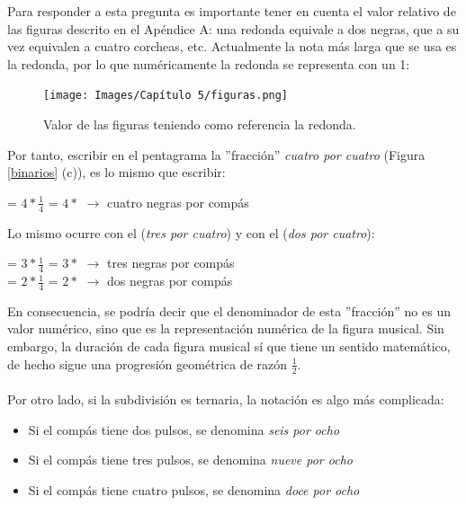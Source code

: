 \documentclass[a4paper, openright, 11pt, titlepage]{report}
\theoremstyle{definition}\newtheorem{defin}[propo]{Definition}
\theoremstyle{definition}\newtheorem{obser}[propo]{Remark}
\theoremstyle{definition}\newtheorem{ejem}[propo]{Ejemplo}
\theoremstyle{definition}\newtheorem{algoritmo}[propo]{Algoritmo}
\begin{document}
Para responder a esta pregunta es importante tener en cuenta el valor relativo de las figuras descrito en el Apéndice A: una redonda equivale a dos negras, que a su vez equivalen a cuatro corcheas, etc. Actualmente la nota más larga que se usa es la redonda, por lo que numéricamente la redonda se representa con un 1:
\begin{figure}[H]
    \centering
    \texttt{[image: Images/Capítulo 5/figuras.png]}
    \caption{Valor de las figuras teniendo como referencia la redonda.}
    \label{redonda}
\end{figure}
Por tanto, escribir en el pentagrama la ''fracción'' \textit{cuatro por cuatro} (Figura \ref{binarios} (c)), es lo mismo que escribir:
\begin{center}
     = $4 * \frac{1}{4}$ = $4 * $\musQuarter \hspace{0.3cm} $\longrightarrow$ \hspace{0.3cm} cuatro negras por compás
\end{center}
Lo mismo ocurre con el  (\textit{tres por cuatro}) y con el  (\textit{dos por cuatro}):
\begin{center}
     = $3 * \frac{1}{4}$ = $3 * $\musQuarter \hspace{0.3cm} $\longrightarrow$ \hspace{0.3cm} tres negras por compás\\
     = $2 * \frac{1}{4}$ = $2 * $\musQuarter \hspace{0.3cm} $\longrightarrow$ \hspace{0.3cm} dos negras por compás
\end{center}
En consecuencia, se podría decir que el denominador de esta ''fracción'' no es un valor numérico, sino que es la representación numérica de la figura musical. Sin embargo, la duración de cada figura musical sí que tiene un sentido matemático, de hecho sigue una progresión geométrica de razón $\frac{1}{2}$.\\\\
Por otro lado, si la subdivisión es ternaria, la notación es algo más complicada: 
\begin{itemize}
    \item Si el compás tiene dos pulsos, se denomina \textit{seis por ocho}
    \item Si el compás tiene tres pulsos, se denomina \textit{nueve por ocho}
    \item Si el compás tiene cuatro pulsos, se denomina \textit{doce por ocho}
\end{itemize}
\end{document}
